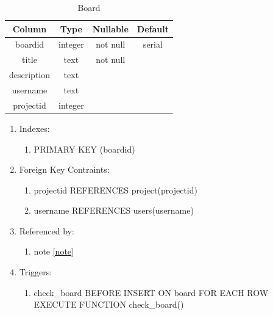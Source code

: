 \documentclass[conference]{IEEEtran}
\begin{document}
\begin{table}[htbp]
  \caption{Board}
  \begin{center}
    \begin{tabular}{|c|c|c|c|}
      \hline
      \textbf{Column} & \textbf{Type} & \textbf{Nullable} & \textbf{Default}\\
      \hline
      boardid & integer & not null & serial\\
      title & text & not null &\\
      description & text &&\\
      username & text &&\\
      projectid & integer &&\\
      \hline
    \end{tabular}
    \begin{enumerate}
    \item Indexes:
      \begin{enumerate}
      \item PRIMARY KEY (boardid)
      \end{enumerate}
    \item Foreign Key Contraints:
      \begin{enumerate}
      \item projectid REFERENCES project(projectid)
      \item username REFERENCES users(username)
      \end{enumerate}
    \item Referenced by:
      \begin{enumerate}
        \item note \ref{note}
      \end{enumerate}
    \item Triggers:
      \begin{enumerate}
        \item check\_board BEFORE INSERT ON board FOR EACH ROW EXECUTE FUNCTION check\_board()
      \end{enumerate}
    \end{enumerate}
    \label{board}
  \end{center}
\end{table}
\end{document}
